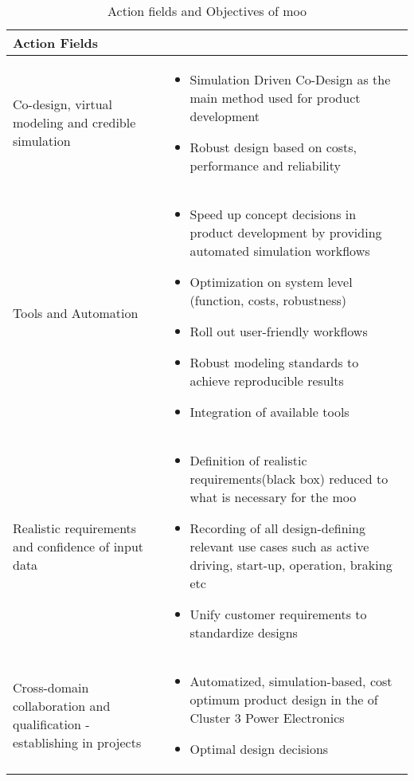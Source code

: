 \newpage
\begin{center}
        \begin{table}[h!]
        \begin{tabular}{|>{\centering\arraybackslash}p{2cm}|>{\centering\arraybackslash}p{12cm}|}
        \hline
        \rowcolor{yellow!25} \Large{\textbf{Action Fields}} & \Large{\textbf{\multirow{2}{*}{\centering Objective / Purpose}}} \\
        \hline
        \centering
		Co-design, virtual modeling and credible simulation & 
        \begin{itemize}
            \item Simulation Driven Co-Design as the main method used for product development
            \item Robust design based on costs, performance and reliability
        \end{itemize}\\
        \hline
        Tools and Automation &
        \begin{itemize}
			\item Speed up concept decisions in product 
            development by providing automated simulation workflows
            \item Optimization on system level (function, costs, robustness)
            \item Roll out user-friendly workflows
            \item Robust modeling standards to achieve reproducible results
            \item Integration of available tools
        \end{itemize}\\
		\hline
        Realistic requirements and confidence of input data &
        \begin{itemize}
            \item Definition of realistic requirements(black box) reduced to what is necessary for the \ac{moo}
            \item Recording of all design-defining relevant use cases such as active driving, start-up, operation, braking etc
            \item Unify customer requirements to standardize designs 
        \end{itemize}\\
        \hline
        Cross-domain collaboration and qualification - establishing in projects & 
        \begin{itemize}
            \item Automatized, simulation-based, cost optimum product design in the of Cluster 3 Power Electronics
            \item Optimal design decisions
        \end{itemize}\\
        \hline
        \end{tabular}
        \caption{Action fields and Objectives of \ac{moo}}
        \label{action_field_table}
        \end{table}
\end{center}



